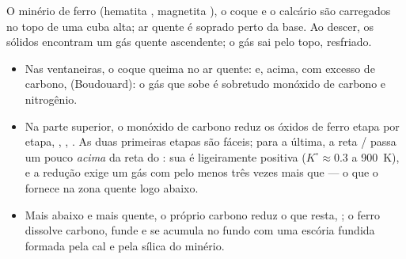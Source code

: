 O minério de ferro (hematita , magnetita ), o coque e o
calcário são carregados no topo de uma cuba alta; ar quente é soprado
perto da base. Ao descer, os sólidos encontram um gás quente ascendente; o gás
sai pelo topo, resfriado.
\begin{itemize}
  \item Nas ventaneiras, o coque queima no ar quente:  e,
        acima, com excesso de carbono,  (Boudouard): o gás
        que sobe é sobretudo monóxido de carbono e nitrogênio.
  \item Na parte superior, o monóxido de carbono reduz os óxidos de ferro
        etapa por etapa, , ,
        . As duas primeiras etapas são fáceis; para a
        última, a reta / passa um pouco \textit{acima} da reta
        do : sua  é ligeiramente
        positiva ($K^\circ \approx 0.3$ a \qty{900}{K}), e a redução exige um
        gás com pelo menos três vezes mais  que  --- o que o
         fornece na zona quente logo abaixo.
  \item Mais abaixo e mais quente, o próprio carbono reduz o que resta, ; o ferro dissolve carbono, funde e se acumula no fundo
        com uma escória fundida formada pela cal e pela sílica do minério.
\end{itemize}

